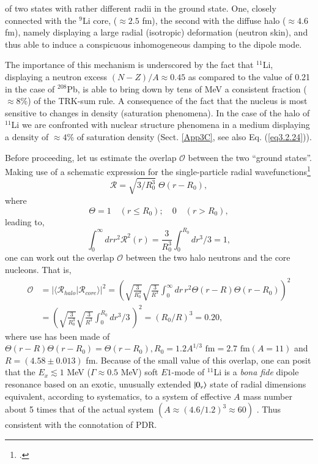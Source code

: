 of two states with rather different radii in the ground state. One, closely connected with the $^{9}$Li core, ($\approx 2.5$ fm), the second with the diffuse halo ($\approx 4.6$ fm), namely displaying a large radial (isotropic) deformation (neutron skin), and thus able to induce a conspicuous inhomogeneous damping to the dipole mode. 


The importance of this mechanism is underscored by the fact that  $^{11}$Li, displaying a neutron excess $(N-Z)/A\approx0.45$ as compared to the value of 0.21 in the case of $^{208}$Pb, is able to bring down by tens of MeV a consistent fraction ($\approx 8$\%) of the TRK-sum rule. A consequence of the fact that the nucleus is most sensitive to changes in density (saturation phenomena). In the case of the halo of $^{11}$Li we are confronted with nuclear structure phenomena in a medium displaying a density of $\approx 4$\% of saturation density (Sect. \ref{App3C}, see also Eq. (\ref{eq3.2.24})). 

Before proceeding, let us estimate the overlap $\mathcal{O}$ between the two ``ground states''. Making use of a schematic expression for the single-particle radial wavefunctions\footnote{\cite{Bohr:69}.}
\begin{equation}
\mathcal{R}=\sqrt{3/R_0^3}\;\Theta(r-R_0),
\end{equation}
where 
\begin{equation*}
\Theta=1 \quad (r\leq R_0);\quad 0 \quad (r>R_0),
\end{equation*}
leading to,
\begin{equation}
\int_0^{\infty}dr r^2 \mathcal{R}^2(r)=\frac{3}{R_0^3}\int_0^{R_0}dr^3/3=1,
\end{equation}
one can work out the overlap $\mathcal{O}$ between the two halo neutrons and the core nucleons. That is, 
\begin{equation}\label{eq2.6.4}
\begin{split}
\mathcal{O}&=|\langle\mathcal{R}_{halo}|\mathcal{R}_{core}\rangle|^2=\left(\sqrt{\frac{3}{R_0^3}}\sqrt{\frac{3}{R^3}}\int_0^{\infty}dr\,r^2\Theta(r-R)\Theta(r-R_0)\right)^2\\
&=\left(\sqrt{\frac{3}{R_0^3}}\sqrt{\frac{3}{R^3}}\int_0^{R_0}dr^3/3\,\right)^2=(R_0/R)^3=0.20,
\end{split}
\end{equation}
where use has been made of $\Theta(r-R)\Theta(r-R_0)=\Theta(r-R_0), R_0=1.2A^{1/3} \text{ fm}=2.7 \text{ fm} (A=11)$ and $R=(4.58\pm 0.013)$ fm.
Because of the small value of this overlap, one can posit that the $E_x\lesssim1$ MeV ($\Gamma \approx 0.5$ MeV) soft $E1$-mode of $^{11}$Li is a \textit{bona fide} dipole  resonance based on an exotic, unusually extended $|{0_\nu} \rangle$ state of radial dimensions equivalent, according to systematics, to  a system of effective $A$ mass number about 5 times that of the actual system $(A\approx (4.6/1.2)^3\approx 60)$ .
 Thus consistent with the connotation of PDR.

